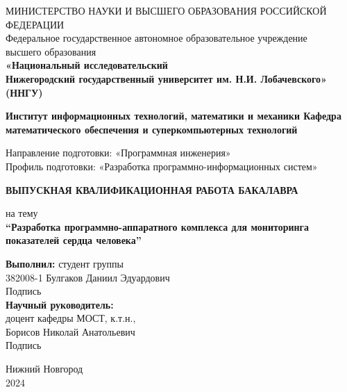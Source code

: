 \documentclass[12pt, russian]{extarticle}
\title{}
\author{}
\date{}
\begin{document}

\begin{titlepage}

    \begin{center}
        МИНИСТЕРСТВО НАУКИ И ВЫСШЕГО ОБРАЗОВАНИЯ РОССИЙСКОЙ ФЕДЕРАЦИИ \\
        Федеральное государственное автономное образовательное учреждение \\
        высшего образования \\
        \textbf{
            «Национальный исследовательский \\
            Нижегородский государственный университет им. Н.И. Лобачевского»\\ (ННГУ)
        }
    \bigbreak

    \vspace{2em}
        \textbf{
            Институт информационных технологий, математики и механики
            \bigbreak
            Кафедра математического обеспечения и суперкомпьютерных технологий
        }

        Направление подготовки: «Программная инженерия» \\
        Профиль подготовки: «Разработка программно-информационных систем»

        \bigbreak
        \bigbreak
        \bigbreak

        \textbf{ВЫПУСКНАЯ КВАЛИФИКАЦИОННАЯ РАБОТА БАКАЛАВРА}
        \bigbreak

        на тему \\
        {\bfseries ``Разработка программно-аппаратного комплекса для мониторинга показателей сердца
        человека''}
    \end{center}

    \vspace{5em}

    \begin{flushright}
        {\bfseries Выполнил:} студент группы \\ 382008-1 Булгаков Даниил Эдуардович\\
        \hfill Подпись \hspace{5em} \newline \\
        {\bfseries Научный руководитель:} \\доцент кафедры МОСТ, к.т.н., \\ Борисов Николай Анатольевич \\
        \hfill Подпись \hspace{5em} \newline \\
    \end{flushright}


    \vspace{\fill}

    \begin{center}
        Нижний Новгород\\2024
    \end{center}

\end{titlepage}
\end{document}
